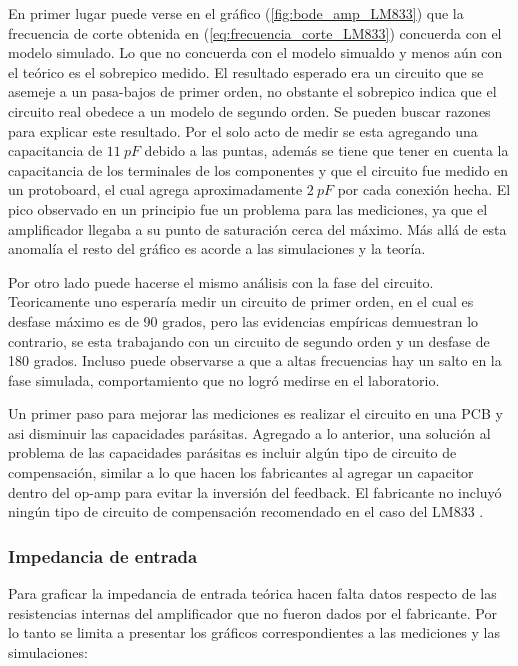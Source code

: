 

En primer lugar puede verse en el gráfico (\ref{fig:bode_amp_LM833}) que la frecuencia de corte obtenida en (\ref{eq:frecuencia_corte_LM833}) concuerda con el modelo simulado. Lo que no concuerda con el modelo simualdo y menos aún con el teórico es el sobrepico medido. El resultado esperado era un circuito que se asemeje a un pasa-bajos de primer orden, no obstante el sobrepico indica que el circuito real obedece a un modelo de segundo orden. Se pueden buscar razones para explicar este resultado. Por el solo acto de medir se esta agregando una capacitancia de $11 \ pF$ debido a las puntas, además se tiene que tener en cuenta la capacitancia de los terminales de los componentes y que el circuito fue medido en un protoboard, el cual agrega aproximadamente $2 \ pF$ por cada conexión hecha. El pico observado en un principio fue un problema para las mediciones, ya que el amplificador llegaba a su punto de saturación cerca del máximo. Más allá de esta anomalía el resto del gráfico es acorde a las simulaciones y la teoría. 

Por otro lado puede hacerse el mismo análisis con la fase del circuito. Teoricamente uno esperaría medir un circuito de primer orden, en el cual es desfase máximo es de 90 grados, pero las evidencias empíricas demuestran lo contrario, se esta trabajando con un circuito de segundo orden y un desfase de 180 grados. Incluso puede observarse a que a altas frecuencias hay un salto en la fase simulada, comportamiento que no logró medirse en el laboratorio.

Un primer paso para mejorar las mediciones es realizar el circuito en una PCB y asi disminuir las capacidades parásitas. Agregado a lo anterior, una solución al problema de las capacidades parásitas es incluir algún tipo de circuito de compensación, similar a lo que hacen los fabricantes al agregar un capacitor dentro del op-amp para evitar la inversión del feedback. El fabricante no incluyó ningún tipo de circuito de compensación recomendado en el caso del LM833 .

\subsubsection{Impedancia de entrada}

Para graficar la impedancia de entrada teórica hacen falta datos respecto de las resistencias internas del amplificador que no fueron dados por el fabricante. Por lo tanto se limita a presentar los gráficos correspondientes a las mediciones y las simulaciones:

